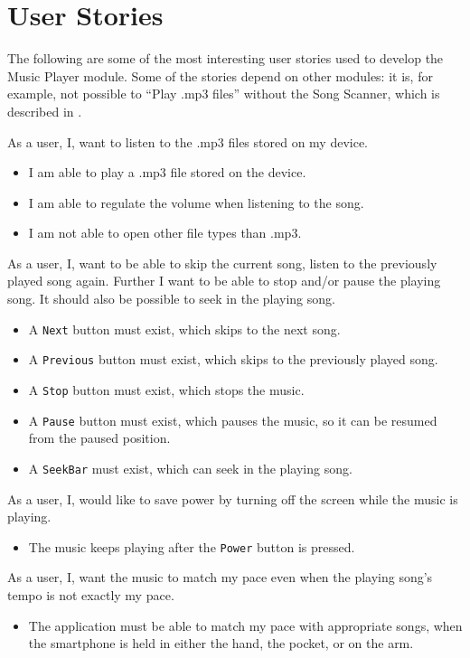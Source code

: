 \section{User Stories}
The following are some of the most interesting user stories used to develop the Music Player module. Some of the stories depend on other modules: it is, for example, not possible to ``Play .mp3 files'' without the Song Scanner, which is described in .

{As a user, I, want to listen to the .mp3 files stored on my device.}
{\begin{itemize}
\item I am able to play a .mp3 file stored on the device.
\item I am able to regulate the volume when listening to the song.
\item I am not able to open other file types than .mp3.
\end{itemize}}

{As a user, I, want to be able to skip the current song, listen to the previously played song again. 
Further I want to be able to stop and/or pause the playing song.
It should also be possible to seek in the playing song.}
{\begin{itemize}
\item A \texttt{Next} button must exist, which skips to the next song.
\item A \texttt{Previous} button must exist, which skips to the previously played song.
\item A \texttt{Stop} button must exist, which stops the music.
\item A \texttt{Pause} button must exist, which pauses the music, so it can be resumed from the paused position.
\item A \texttt{SeekBar} must exist, which can seek in the playing song.
\end{itemize}}

{As a user, I, would like to save power by turning off the screen while the music is playing.}
{\begin{itemize}
\item The music keeps playing after the \texttt{Power} button is pressed.
\end{itemize}}

{As a user, I, want the music to match my pace even when the playing song's tempo is not exactly my pace.}
{\begin{itemize}
\item The application must be able to match my pace with appropriate songs, when the smartphone is held in either the hand, the pocket, or on the arm.
\end{itemize}}


